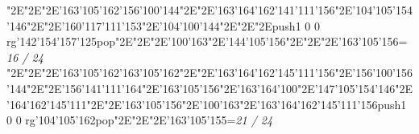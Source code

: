 \null\vfill\enskip\enskip\enskip\ipa\char"2E\enskip\enskip\enskip\ipa\char"2E\enskip\ipa\char"2E\ipa\char'163\ipa\char'105\ipa\char'162\bigskip\ipa\char'156\ipa\char'100\ipa\char'144\ipa\char"2E\enskip\enskip\enskip\ipa\char"2E\ipa\char'163\ipa\char'164\ipa\char'162\ipa\char'141\ipa\char'111\ipa\char'156\bigskip\enskip\enskip\ipa\char"2E\ipa\char'104\ipa\char'105\ipa\char'154\ipa\char'146\ipa\char"2E\enskip\ipa\char"2E\ipa\char'160\ipa\char'117\ipa\char'111\ipa\char'153\ipa\char"2E\ipa\char'104\ipa\char'100\ipa\char'144\ipa\char"2E\enskip\enskip\enskip\ipa\char"2E\enskip\enskip\enskip\enskip\bigskip\enskip\ipa\char"2E\pdfcolorstack\match push{1 0 0 rg}\ipa\char'142\ipa\char'154\ipa\char'157\ipa\char'125\pdfcolorstack\match pop{}\ipa\char"2E\enskip\enskip\ipa\char"2E\enskip\enskip\enskip\ipa\char"2E\ipa\char'100\ipa\char'163\ipa\char"2E\enskip\enskip\enskip\enskip\enskip\enskip\bigskip\ipa\char'144\ipa\char'105\ipa\char'156\ipa\char"2E\enskip\enskip\ipa\char"2E\enskip\enskip\enskip\ipa\char"2E\ipa\char'163\ipa\char'105\ipa\char'156\bigskip\vfill\footline={\hfill\tenrm\it 16 / 24}\eject
\null\vfill\enskip\enskip\enskip\ipa\char"2E\enskip\enskip\enskip\ipa\char"2E\enskip\ipa\char"2E\ipa\char'163\ipa\char'105\ipa\char'162\bigskip\ipa\char'163\ipa\char'105\ipa\char'162\ipa\char"2E\enskip\enskip\enskip\ipa\char"2E\ipa\char'163\ipa\char'164\ipa\char'162\ipa\char'145\ipa\char'111\ipa\char'156\bigskip\enskip\enskip\ipa\char"2E\ipa\char'156\ipa\char'100\ipa\char'156\ipa\char'144\ipa\char"2E\enskip\ipa\char"2E\ipa\char'156\ipa\char'141\ipa\char'111\ipa\char'164\ipa\char"2E\ipa\char'163\ipa\char'105\ipa\char'156\ipa\char"2E\ipa\char'163\ipa\char'164\ipa\char'100\ipa\char"2E\ipa\char'147\ipa\char'105\ipa\char'154\ipa\char'146\bigskip\enskip\ipa\char"2E\ipa\char'164\ipa\char'162\ipa\char'145\ipa\char'111\ipa\char"2E\enskip\enskip\ipa\char"2E\ipa\char'163\ipa\char'105\ipa\char'156\ipa\char"2E\ipa\char'100\ipa\char'163\ipa\char"2E\ipa\char'163\ipa\char'164\ipa\char'162\ipa\char'145\ipa\char'111\ipa\char'156\bigskip\pdfcolorstack\match push{1 0 0 rg}\ipa\char'104\ipa\char'105\ipa\char'162\pdfcolorstack\match pop{}\ipa\char"2E\enskip\enskip\ipa\char"2E\enskip\enskip\enskip\ipa\char"2E\ipa\char'163\ipa\char'105\ipa\char'155\bigskip\vfill\footline={\hfill\tenrm\it 21 / 24}\eject
